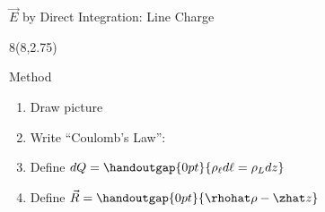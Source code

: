 \begin{frame}{$\vec{E}$ by Direct Integration: Line Charge}
\begin{textblock}{8}(8,2.75)
\begin{myblock}[0.9]{Method}
	\begin{enumerate}
		\setlength\itemsep{12pt}
		\item Draw picture 
		\item Write ``Coulomb's Law'':
			
			\vspace{-18pt}
			\vspace{-28pt}
			
		\item Define $dQ = \handoutgap{0pt}{\rho_\ell d\ell = \rho_L dz} $ 
		\item Define $\vec{R} = \handoutgap{0pt}{ \rhohat \rho - \zhat z } $ 
		\vspace{-8pt}
		
	\end{enumerate}
\end{myblock}
\end{textblock}
\end{frame}


